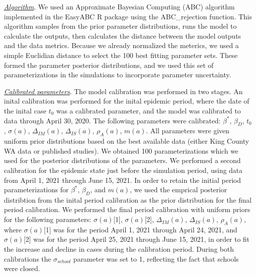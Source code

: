 \documentclass[11pt]{article}
\begin{document}
\underline{\it Algorithm}. We used an Approximate Bayesian Computing (ABC) algorithm implemented in the EasyABC R package using the ABC\_rejection function. This algorithm samples from the prior parameter distributions, runs the model to calculate the outputs, then calculates the distance between the model outputs and the data metrics. Because we already normalized the meterics, we used a simple Euclidian distance to select the 100 best fitting parameter sets. These formed the parameter posterior distributions, and we used this set of parameterizations in the simulations to incorporate parameter uncertainty.

\underline{\it Calibrated parameters}. The model calibration was performed in two stages. An inital calibration was performed for the inital epidemic period, where the date of the inital case $t_0$ was a calibrated parameter, and the model was calibrated to data through April 30, 2020. The following parameters were calibrated: $\beta^*$, $\beta_D$, $t_0$, $\sigma(a)$, $\Delta_{IM}(a)$, $\Delta_{IS}(a)$, $\rho_A(a)$, $m(a)$. All parameters were given uniform prior distributions based on the best available data (either King County WA data or published studies). We obtained 100 parameterizations which we used for the posterior distributions of the parameters. We performed a second calibration for the epidemic state just before the simulation period, using data from April 1, 2021 through June 15, 2021. In order to retain the initial period parameterizations for $\beta^*$, $\beta_D$, and $m(a)$, we used the emprical posterior distribtion from the inital period calibration as the prior distribution for the final period calibration. We performed the final period calibration with uniform priors for the following parameters: $\sigma(a)$[1], $\sigma(a)$[2], $\Delta_{IM}(a)$, $\Delta_{IS}(a)$, $\rho_A(a)$, where $\sigma(a)$[1] was for the period April 1, 2021 through April 24, 2021, and $\sigma(a)$[2] was for the period April 25, 2021 through June 15, 2021, in order to fit the increase and decline in cases during the calibration period. During both calibrations the $\sigma_{school}$ parameter was set to 1, reflecting the fact that schools were closed.
\end{document}
